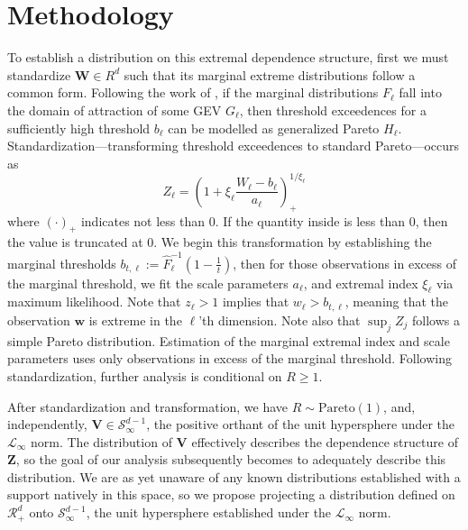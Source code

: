 \section{Methodology}
To establish a distribution on this extremal dependence structure, first we must standardize
  $\bm{W} \in R^d$ such that its marginal extreme distributions follow a common form.  Following
  the work of \cite{ferreira2014}, if the marginal distributions $F_{\ell}$ fall into the domain
  of attraction of some GEV $G_{\ell}$, then threshold exceedences for a sufficiently high threshold
  $b_{\ell}$ can be modelled as generalized Pareto $H_{\ell}$.  Standardization---transforming threshold
  exceedences to standard Pareto---occurs as
  \begin{equation}
    \label{eqn:standardization}
    Z_{\ell} = \left(1 + \xi_{\ell}\frac{W_{\ell} - b_{\ell}}{a_{\ell}}\right)_{+}^{1/\xi_{\ell}}
  \end{equation}
  where $(\cdot)_{+}$ indicates not less than 0. If the quantity inside is less than 0, then the value
  is truncated at 0.  We begin this transformation by establishing the marginal thresholds
  $b_{t,\ell} := \hat{F}_{\ell}^{-1}\left(1 - \frac{1}{t}\right)$, then for those observations
  in excess of the marginal threshold, we fit the scale parameters $a_{\ell}$, and extremal index $\xi_{\ell}$
  via maximum likelihood. Note that $z_{\ell} > 1$ implies that $w_{\ell} > b_{t,\ell}$, meaning that the observation
  $\bm{w}$ is extreme in the $\ell$'th dimension.  Note also that $\sup_j Z_j$ follows a simple Pareto
  distribution. Estimation of the marginal extremal index and scale parameters uses only observations
  in excess of the marginal threshold. Following standardization, further analysis is conditional on
  $R \geq 1$.

After standardization and transformation, we have $R\sim\text{Pareto}(1)$, and, independently,
  $\bm{V}\in\mathcal{S}_{\infty}^{d-1}$, the positive orthant of the unit hypersphere under the
  $\mathcal{L}_{\infty}$ norm.  The distribution of $\bm{V}$ effectively describes the dependence
  structure of $\bm{Z}$, so the goal of our analysis subsequently becomes to adequately describe this
  distribution.  We are as yet unaware of any known distributions established with a support
  natively in this space, so we propose projecting a distribution defined on $\mathcal{R}_{+}^{d}$ onto
  $\mathcal{S}_{\infty}^{d-1}$, the unit hypersphere established under the $\mathcal{L}_{\infty}$ norm.

  

  

  

